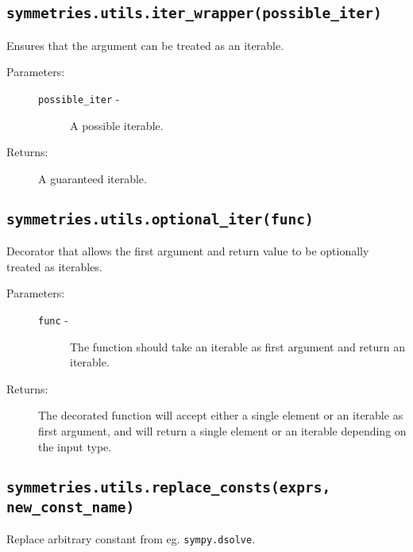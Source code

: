\subsection*{\lstinline{symmetries.utils.iter_wrapper(possible_iter)}}

   Ensures that the argument can be treated as an iterable.

   \begin{description}
      \item[Parameters:] \leavevmode
        \begin{description}
            \item[\lstinline{possible_iter} -] A possible iterable.
        \end{description}
      \item[Returns:] A guaranteed iterable.
   \end{description}      

\subsection*{\lstinline{symmetries.utils.optional_iter(func)}}

   Decorator that allows the first argument and return value to be
   optionally treated as iterables.

   \begin{description}
      \item[Parameters:] \leavevmode
        \begin{description}
            \item[\lstinline{func} -] The function should take an iterable as first argument and return an iterable.
        \end{description}
      \item[Returns:] The decorated function will accept either a single element or an iterable as first argument, and will return a single element or an iterable depending on the input type.
   \end{description}

\subsection*{\lstinline{symmetries.utils.replace_consts(exprs, new_const_name)}}

   Replace arbitrary constant from eg. \lstinline{sympy.dsolve}.


